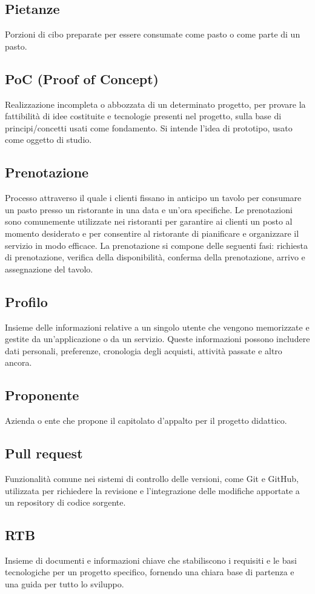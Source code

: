 \subsection{Pietanze}Porzioni di cibo preparate per essere consumate come pasto o come parte di un pasto.
\subsection{PoC (Proof of Concept)}Realizzazione incompleta o abbozzata di un determinato progetto, per provare la fattibilità di idee costituite e tecnologie presenti nel progetto, sulla base di principi/concetti usati come fondamento. Si intende l’idea di prototipo, usato come oggetto di studio.
\subsection{Prenotazione}Processo attraverso il quale i clienti fissano in anticipo un tavolo per consumare un pasto presso un ristorante in una data e un'ora specifiche. Le prenotazioni sono comunemente utilizzate nei ristoranti per garantire ai clienti un posto al momento desiderato e per consentire al ristorante di pianificare e organizzare il servizio in modo efficace. La prenotazione si compone delle seguenti fasi: richiesta di prenotazione, verifica della disponibilità, conferma della prenotazione, arrivo e assegnazione del tavolo.
\subsection{Profilo}Insieme delle informazioni relative a un singolo utente che vengono memorizzate e gestite da un'applicazione o da un servizio. Queste informazioni possono includere dati personali, preferenze, cronologia degli acquisti, attività passate e altro ancora.
\subsection{Proponente}Azienda o ente che propone il capitolato d’appalto per il progetto didattico.
\subsection{Pull request}Funzionalità comune nei sistemi di controllo delle versioni, come Git e GitHub, utilizzata per richiedere la revisione e l'integrazione delle modifiche apportate a un repository di codice sorgente.
\subsection{RTB}Insieme di documenti e informazioni chiave che stabiliscono i requisiti e le basi tecnologiche per un progetto specifico, fornendo una chiara base di partenza e una guida per tutto lo sviluppo.
